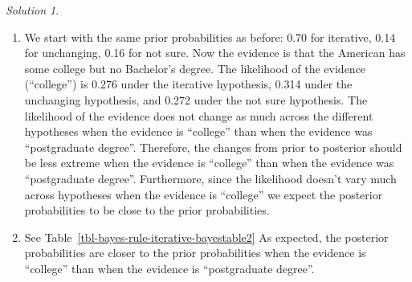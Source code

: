 \documentclass[
  letterpaper,
  DIV=11,
  numbers=noendperiod]{scrreprt}
\providecommand{\tightlist}{%
  \setlength{\itemsep}{0pt}\setlength{\parskip}{0pt}}
\theoremstyle{plain}
\theoremstyle{definition}
\theoremstyle{definition}
\theoremstyle{definition}
\theoremstyle{remark}
\newtheorem{refsolution}{Solution}[chapter]
\begin{document}
\begin{tcolorbox}[enhanced jigsaw, opacityback=0, rightrule=.15mm, coltitle=black, colframe=quarto-callout-tip-color-frame, toprule=.15mm, colbacktitle=quarto-callout-tip-color!10!white, opacitybacktitle=0.6, left=2mm, toptitle=1mm, breakable, title={Solution (click to expand)}, bottomtitle=1mm, colback=white, leftrule=.75mm, titlerule=0mm, arc=.35mm, bottomrule=.15mm]

\begin{refsolution}
\leavevmode

\begin{enumerate}
\def\labelenumi{\arabic{enumi}.}
\tightlist
\item
  We start with the same prior probabilities as before: 0.70 for
  iterative, 0.14 for unchanging, 0.16 for not sure. Now the evidence is
  that the American has some college but no Bachelor's degree. The
  likelihood of the evidence (``college'') is 0.276 under the iterative
  hypothesis, 0.314 under the unchanging hypothesis, and 0.272 under the
  not sure hypothesis. The likelihood of the evidence does not change as
  much across the different hypotheses when the evidence is ``college''
  than when the evidence was ``postgraduate degree''. Therefore, the
  changes from prior to posterior should be less extreme when the
  evidence is ``college'' than when the evidence was ``postgraduate
  degree''. Furthermore, since the likelihood doesn't vary much across
  hypotheses when the evidence is ``college'' we expect the posterior
  probabilities to be close to the prior probabilities.
\item
  See Table~\ref{tbl-bayes-rule-iterative-bayestable2} As expected, the
  posterior probabilities are closer to the prior probabilities when the
  evidence is ``college'' than when the evidence is ``postgraduate
  degree''.
\end{enumerate}

\label{sol-bayes-rule-iterative-bayestable2}

\end{refsolution}

\end{tcolorbox}
\end{document}

